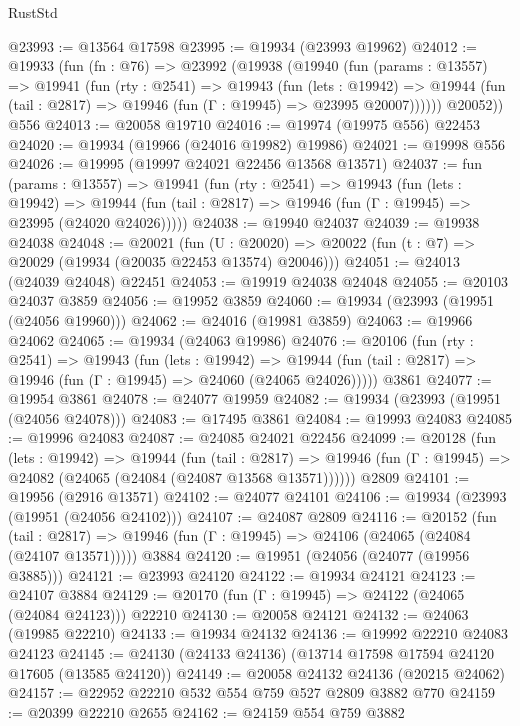 \begin{lexlean}{RustStd}
\begin{coremodule}
@23993 := @13564 @17598
@23995 := @19934 (@23993 @19962)
@24012 := @19933
    (fun (fn : @76) =>
    @23992
      (@19938
        (@19940
          (fun (params : @13557) =>
          @19941
            (fun (rty : @2541) =>
            @19943
              (fun (lets : @19942) =>
              @19944 (fun (tail : @2817) => @19946 (fun (Γ : @19945) => @23995 @20007))))))
        @20052))
    @556
@24013 := @20058 @19710
@24016 := @19974 (@19975 @556) @22453
@24020 := @19934 (@19966 (@24016 @19982) @19986)
@24021 := @19998 @556
@24026 := @19995 (@19997 @24021 @22456 @13568 @13571)
@24037 := fun (params : @13557) =>
  @19941
    (fun (rty : @2541) =>
    @19943
      (fun (lets : @19942) =>
      @19944 (fun (tail : @2817) => @19946 (fun (Γ : @19945) => @23995 (@24020 @24026)))))
@24038 := @19940 @24037
@24039 := @19938 @24038
@24048 := @20021
    (fun (U : @20020) => @20022 (fun (t : @7) => @20029 (@19934 (@20035 @22453 @13574) @20046)))
@24051 := @24013 (@24039 @24048) @22451
@24053 := @19919 @24038 @24048
@24055 := @20103 @24037 @3859
@24056 := @19952 @3859
@24060 := @19934 (@23993 (@19951 (@24056 @19960)))
@24062 := @24016 (@19981 @3859)
@24063 := @19966 @24062
@24065 := @19934 (@24063 @19986)
@24076 := @20106
    (fun (rty : @2541) =>
    @19943
      (fun (lets : @19942) =>
      @19944 (fun (tail : @2817) => @19946 (fun (Γ : @19945) => @24060 (@24065 @24026)))))
    @3861
@24077 := @19954 @3861
@24078 := @24077 @19959
@24082 := @19934 (@23993 (@19951 (@24056 @24078)))
@24083 := @17495 @3861
@24084 := @19993 @24083
@24085 := @19996 @24083
@24087 := @24085 @24021 @22456
@24099 := @20128
    (fun (lets : @19942) =>
    @19944
      (fun (tail : @2817) =>
      @19946 (fun (Γ : @19945) => @24082 (@24065 (@24084 (@24087 @13568 @13571))))))
    @2809
@24101 := @19956 (@2916 @13571)
@24102 := @24077 @24101
@24106 := @19934 (@23993 (@19951 (@24056 @24102)))
@24107 := @24087 @2809
@24116 := @20152
    (fun (tail : @2817) => @19946 (fun (Γ : @19945) => @24106 (@24065 (@24084 (@24107 @13571)))))
    @3884
@24120 := @19951 (@24056 (@24077 (@19956 @3885)))
@24121 := @23993 @24120
@24122 := @19934 @24121
@24123 := @24107 @3884
@24129 := @20170 (fun (Γ : @19945) => @24122 (@24065 (@24084 @24123))) @22210
@24130 := @20058 @24121
@24132 := @24063 (@19985 @22210)
@24133 := @19934 @24132
@24136 := @19992 @22210 @24083 @24123
@24145 := @24130 (@24133 @24136) (@13714 @17598 @17594 @24120 @17605 (@13585 @24120))
@24149 := @20058 @24132 @24136 (@20215 @24062)
@24157 := @22952 @22210 @532 @554 @759 @527 @2809 @3882 @770
@24159 := @20399 @22210 @2655
@24162 := @24159 @554 @759 @3882

\end{coremodule}
\end{lexlean}
